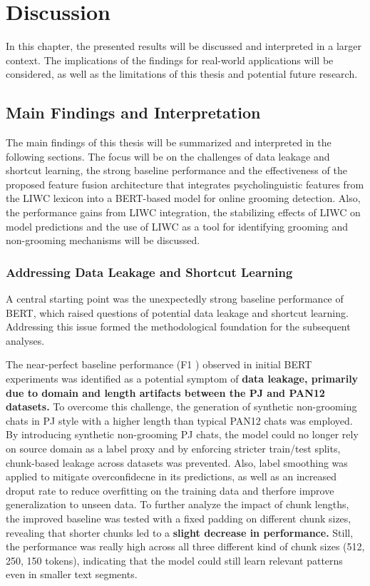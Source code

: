 \chapter{Discussion}
In this chapter, the presented results will be discussed and interpreted in a larger context. The implications of the findings for real-world applications will be considered, as well as the limitations of this thesis and potential future research. 


\section{Main Findings and Interpretation}

The main findings of this thesis will be summarized and interpreted in the following sections. The focus will be on the challenges of data leakage and shortcut learning, the strong baseline performance and the effectiveness of the proposed feature fusion architecture that integrates psycholinguistic features from the LIWC lexicon into a BERT-based model for online grooming detection.  Also, the performance gains from LIWC integration, the stabilizing effects of LIWC on model predictions and the use of LIWC as a tool for identifying grooming and non-grooming mechanisms will be discussed. 



\subsection{Addressing Data Leakage and Shortcut Learning}
A central starting point was the unexpectedly strong baseline performance of BERT, which raised questions of potential data leakage and shortcut learning. Addressing this issue formed the methodological foundation for the subsequent analyses.

The near-perfect baseline performance (F1 ) observed in initial BERT experiments was identified as a potential symptom of \textbf{data leakage, primarily due to domain and length artifacts between the PJ and PAN12 datasets.} To overcome this challenge, the generation of synthetic non-grooming chats in PJ style with a higher length than typical PAN12 chats was employed. By introducing synthetic non-grooming PJ chats, the model could no longer rely on source domain as a label proxy and by enforcing stricter train/test splits, chunk-based leakage across datasets was prevented. Also, label smoothing was applied to mitigate overconfidecne in its predictions, as well as an increased droput rate to reduce overfitting on the training data and therfore improve generalization to unseen data. To further analyze the impact of chunk lengths, the improved baseline was tested with a fixed padding on different chunk sizes, revealing that shorter chunks led to a \textbf{slight decrease in performance.} Still, the performance was really high across all three different kind of chunk sizes (512, 250, 150 tokens), indicating that the model could still learn relevant patterns even in smaller text segments. 


